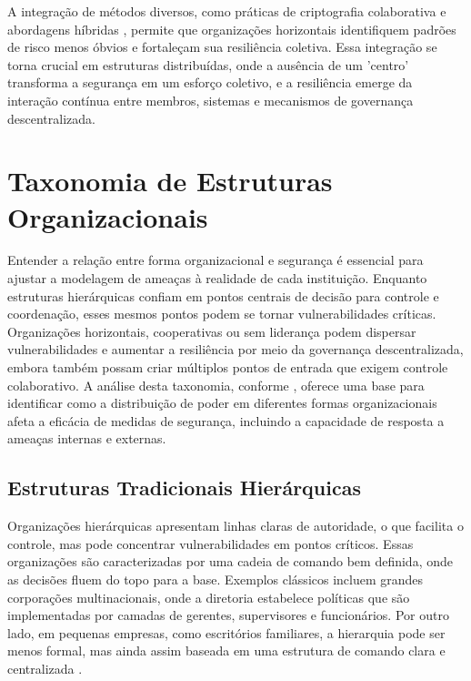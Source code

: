 A integração de métodos diversos, como práticas de criptografia
colaborativa \cite{AbcCrypto} e abordagens híbridas \cite{CoReTM}, permite
que organizações horizontais identifiquem padrões de risco menos óbvios e
fortaleçam sua resiliência coletiva. Essa integração se torna crucial em
estruturas distribuídas, onde a ausência de um 'centro' transforma a
segurança em um esforço coletivo, e a resiliência emerge da interação
contínua entre membros, sistemas e mecanismos de governança
descentralizada.

\section{Taxonomia de Estruturas Organizacionais}
\label{sec:taxonomia_de_estruturas_organizacionais}

Entender a relação entre forma organizacional e segurança é essencial para
ajustar a modelagem de ameaças à realidade de cada instituição. Enquanto
estruturas hierárquicas confiam em pontos centrais de decisão para controle
e coordenação, esses mesmos pontos podem se tornar vulnerabilidades
críticas. Organizações horizontais, cooperativas ou sem liderança podem
dispersar vulnerabilidades e aumentar a resiliência por meio da governança
descentralizada, embora também possam criar múltiplos pontos de entrada que
exigem controle colaborativo. A análise desta taxonomia, conforme
\cite{WorkerCooperativesinAmerica, RealNotNominalGlobalDemocracy}, oferece
uma base para identificar como a distribuição de poder em diferentes formas
organizacionais afeta a eficácia de medidas de segurança, incluindo a
capacidade de resposta a ameaças internas e externas.

\subsection{Estruturas Tradicionais Hierárquicas}
\label{sec:estruturas_tradicionais_hierarquicas}

Organizações hierárquicas apresentam linhas claras de autoridade, o que
facilita o controle, mas pode concentrar vulnerabilidades em pontos
críticos. Essas organizações são caracterizadas por uma cadeia de comando
bem definida, onde as decisões fluem do topo para a base. Exemplos
clássicos incluem grandes corporações multinacionais, onde a diretoria
estabelece políticas que são implementadas por camadas de gerentes,
supervisores e funcionários. Por outro lado, em pequenas empresas, como
escritórios familiares, a hierarquia pode ser menos formal, mas ainda assim
baseada em uma estrutura de comando clara e centralizada \cite{WorkerCooperativesinAmerica}.

